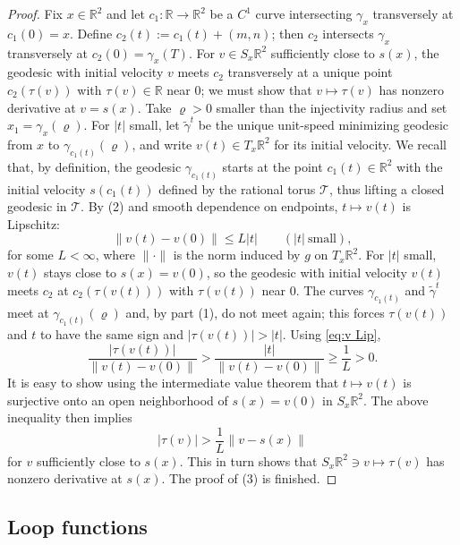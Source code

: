 \documentclass[11pt,letterpaper,oneside]{amsart}
\newcommand{\R}{\mathbb{R}}
\theoremstyle{definition}
\theoremstyle{remark}
\theoremstyle{definition}
\theoremstyle{remark}
\newcommand{\CT}{\mathcal{T}}
\begin{document}
\begin{proof}
    Fix $x\in \R^2$ and let $c_1:\R\to \R^2$ be a $C^1$ curve intersecting $\gamma_x$ transversely at $c_1(0)=x$.
    Define $c_2(t):=c_1(t)+(m,n)$; then $c_2$ intersects $\gamma_x$ transversely at $c_2(0)=\gamma_x(T)$.
    For $v\in S_x\R^2$ sufficiently close to $s(x)$, the geodesic with initial velocity $v$ meets $c_2$ transversely at a unique point $c_2(\tau(v))$ with $\tau(v) \in \R$ near $0$; we must show that $v\mapsto \tau(v)$ has nonzero derivative at $v=s(x)$. Take $\varrho>0$ smaller than the injectivity radius and set $x_1=\gamma_x(\varrho)$.
    For $|t|$ small, let $\tilde\gamma^{t}$ be the unique unit-speed minimizing geodesic from $x$ to $\gamma_{c_1(t)}(\varrho)$, and write $v(t)\in T_x\R^2$ for its initial velocity.
    We recall that, by definition, the geodesic $\gamma_{c_1(t)}$ starts at the point $c_1(t)\in \R^2$ with the initial velocity $s(c_1(t))$ defined by the rational torus $\CT$, thus lifting a closed geodesic in $\CT$.
    By (2) and smooth dependence on endpoints, $t\mapsto v(t)$ is Lipschitz:
    \begin{equation}\label{eq:v Lip}
        \|v(t)-v(0)\|\leq L|t| \qquad (|t|\ \text{small}),
    \end{equation}
    for some $L<\infty$, where $\|\cdot\|$ is the norm induced by $g$ on $T_x\R^2$.
    For $|t|$ small, $v(t)$ stays close to $s(x)=v(0)$, so the geodesic with initial velocity $v(t)$ meets $c_2$ at $c_2(\tau(v(t)))$ with $\tau(v(t))$ near $0$.
    The curves $\gamma_{c_1(t)}$ and $\tilde\gamma^{t}$ meet at $\gamma_{c_1(t)}(\varrho)$ and, by part (1), do not meet again; this forces $\tau(v(t))$ and $t$ to have the same sign and $|\tau(v(t))|>|t|$.
    Using \eqref{eq:v Lip},
    \begin{equation*}
        \frac{|\tau(v(t))|}{\|v(t) - v(0)\|} > \frac{|t|}{\|v(t) - v(0)\|} \geq \frac{1}{L} > 0.
    \end{equation*}
    It is easy to show using the intermediate value theorem that $t \mapsto v(t)$ is surjective onto an open neighborhood of $s(x) = v(0)$ in $S_{x}\R^2$.
    The above inequality then implies 
    \begin{equation*}
        |\tau(v)| > \frac{1}{L} \|v - s(x)\|
    \end{equation*}
    for $v$ sufficiently close to $s(x)$.
    This in turn shows that $S_{x}\R^2 \ni v \mapsto \tau(v)$ has nonzero derivative at $s(x)$.
    The proof of (3) is finished.
\end{proof}

\subsection{Loop functions}
\end{document}

